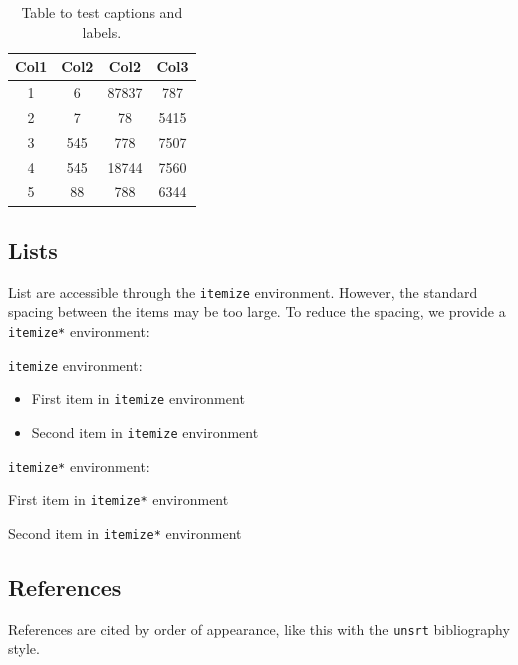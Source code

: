 \documentclass[license]{qirtconference}
\begin{document}
\begin{table}[h!]
\centering
\caption{\label{table:table1} Table to test captions and labels.}
\begin{tabular}{|c|c|c|c|}
 \hline
 Col1 & Col2 & Col2 & Col3 \\ [0.5ex] 
 \hline
 1 & 6 & 87837 & 787 \\ 
 \hline
 2 & 7 & 78 & 5415 \\
 \hline
 3 & 545 & 778 & 7507 \\
 \hline
 4 & 545 & 18744 & 7560 \\
 \hline
 5 & 88 & 788 & 6344 \\ [1ex] 
 \hline
\end{tabular}

\label{table:1}
\end{table}

\subsection{Lists}
List are accessible through the \verb~itemize~ environment. However, the standard spacing between the items may be too large. To reduce the spacing, we provide a \verb~itemize*~ environment:

\verb~itemize~ environment:

\begin{itemize}
\item First item in \verb~itemize~ environment
\item Second item in \verb~itemize~ environment
\end{itemize}

\verb~itemize*~ environment:

\begin{itemize*}
\item First item in \verb~itemize*~ environment
\item Second item in \verb~itemize*~ environment
\end{itemize*}

\subsection{References}
References are cited by order of appearance, like this \cite{MARTIN19771, Kaczmarek2007, inproceedings, RENKIELSKA2006867} with the \verb~unsrt~ bibliography style.


\end{document}
